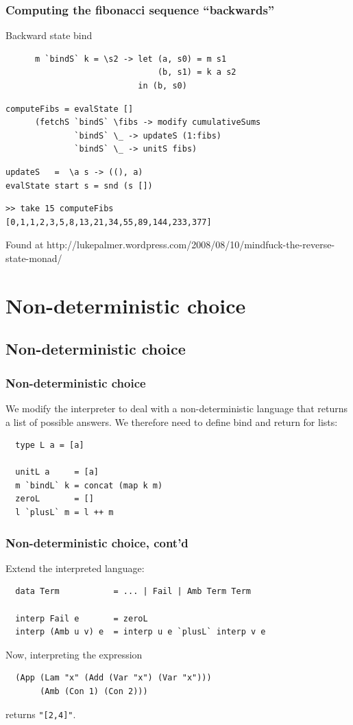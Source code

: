 \documentclass{beamer}
\begin{document}
\begin{frame}[t, fragile]
  \frametitle{Computing the fibonacci sequence "`backwards"'}
  \begin{block}{Backward state bind}
    \begin{lstlisting}
      m `bindS` k = \s2 -> let (a, s0) = m s1
                               (b, s1) = k a s2
                           in (b, s0)
    \end{lstlisting}
  \end{block}
\pause
  \begin{lstlisting}
computeFibs = evalState [] 
      (fetchS `bindS` \fibs -> modify cumulativeSums 
              `bindS` \_ -> updateS (1:fibs) 
              `bindS` \_ -> unitS fibs)
\end{lstlisting}
\pause
\begin{lstlisting}
updateS   =  \a s -> ((), a)
evalState start s = snd (s [])
\end{lstlisting}
\pause
  \begin{lstlisting}
>> take 15 computeFibs
[0,1,1,2,3,5,8,13,21,34,55,89,144,233,377]
  \end{lstlisting}

  Found at {\footnotesize  http://lukepalmer.wordpress.com/2008/08/10/mindfuck-the-reverse-state-monad/}
\end{frame}

\section{Non-deterministic choice}
\subsection{Non-deterministic choice}
\begin{frame}[fragile]
 \frametitle{Non-deterministic choice}
 We modify the interpreter to deal with a non-deterministic language that
 returns a list of possible answers. We therefore need to define bind and
 return for lists:
 \begin{lstlisting}
  type L a = [a]

  unitL a     = [a]
  m `bindL` k = concat (map k m)
  zeroL       = []
  l `plusL` m = l ++ m
 \end{lstlisting}
\end{frame}

\begin{frame}[fragile]
 \frametitle{Non-deterministic choice, cont'd}
 Extend the interpreted language:
 \begin{lstlisting}
  data Term           = ... | Fail | Amb Term Term

  interp Fail e       = zeroL
  interp (Amb u v) e  = interp u e `plusL` interp v e
 \end{lstlisting}

 Now, interpreting the expression
 \begin{lstlisting}
  (App (Lam "x" (Add (Var "x") (Var "x"))) 
       (Amb (Con 1) (Con 2)))
 \end{lstlisting}

 returns \texttt{"[2,4]"}.
\end{frame}
\end{document}
